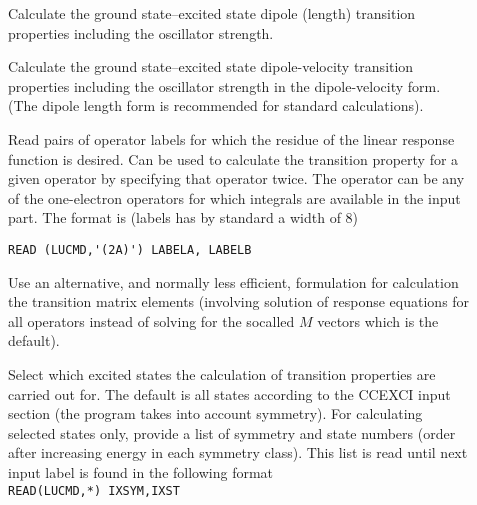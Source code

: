 \begin{description}
\item[] 

Calculate the ground state--excited state dipole (length) transition properties including
the oscillator strength.

\item[] 

Calculate the ground state--excited state dipole-velocity  transition properties including
the oscillator strength in the dipole-velocity form. (The dipole length form is recommended
for standard calculations).

\item[] 

Read pairs of operator labels for which the residue of the linear response function is desired.
Can be used to calculate the transition property for a given operator
by specifying that operator twice. The operator can be any of the one-electron
operators for which integrals are available in the  input part.
The format is  (labels has by standard a width of 8)

\verb|READ (LUCMD,'(2A)') LABELA, LABELB|\newline


\item[] 
 
Use an alternative, and normally less efficient, formulation for calculation
the transition matrix elements (involving solution of response equations for 
all operators instead of solving for the socalled $M$ vectors which is the default).

\item[] 
 
Select which excited states the calculation of transition properties
are carried out for. The default is all states according to the CCEXCI input section
(the program takes into account symmetry). For calculating selected states only,
provide a list of symmetry and state numbers (order after increasing energy in 
each symmetry class). This list is read until next input label is found in the
following format\\

\verb|READ(LUCMD,*) IXSYM,IXST|

\end{description}
